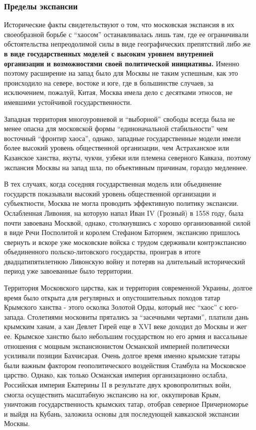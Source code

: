 \subsubsection{Пределы экспансии}

Исторические факты свидетельствуют о том, что московская экспансия в их
своеобразной борьбе с \enquote{хаосом} останавливалась лишь там, где ее ограничивали
обстоятельства непреодолимой силы в виде географических препятствий либо же \textbf{в
виде государственных моделей с высоким уровнем внутренней организации и
возможностями своей политической инициативы.} Именно поэтому расширение на запад
было для Москвы не таким успешным, как это происходило на севере, востоке и
юге, где в большинстве случаев, за исключением, пожалуй, Китая, Москва имела
дело с десятками этносов, не имевшими устойчивой государственности.

Западная территория многоуровневой и \enquote{выборной} свободы всегда была не менее
опасна для московской формы \enquote{единоначальной стабильности} чем восточный
\enquote{фронтир хаоса}, однако, западные государственные модели имели более высокий
уровень общественной организации, чем Астраханское или Казанское ханства,
якуты, чукчи, узбеки или племена северного Кавказа, поэтому экспансия Москвы на
запад шла, по объективным причинам, гораздо медленнее.

В тех случаях, когда соседняя государственная модель или объединение государств
показывали высокий уровень общественной организации и субъектности, Москва не
могла проводить эффективную политику экспансии. Ослабленная Ливония, на которую
напал Иван IV (Грозный) в 1558 году, была почти завоевана Москвой, однако,
столкнувшись с хорошо организованной силой в виде Речи Посполитой и королем
Стефаном Баторием, экспансию пришлось свернуть и вскоре уже московские войска с
трудом сдерживали контрэкспансию объединенного польско-литовского государства,
проиграв в итоге двадцатипятилетнюю Ливонскую войну и потеряв на длительный
исторический период уже завоеванные было территории.

Территория Московского царства, как и территория современной Украины, долгое
время было открыта для регулярных и опустошительных походов татар Крымского
ханства - этого осколка Золотой Орды, который нес \enquote{хаос} с юго-запада.
Столетиями московиты прятались за \enquote{засечными чертами}, платили дань крымским
ханам, а хан Девлет Гирей еще в XVI веке доходил до Москвы и жег ее. Крымское
ханство было небольшим государством но его армия и вассальные отношения с
мощным экспансионистом Османской империей политически усиливали позиции
Бахчисарая. Очень долгое время именно крымские татары были важным фактором
геополитического воздействия Стамбула на Московское царство. Однако, как только
Османская империя организационно ослабла, Российская империя Екатерины II в
результате двух кровопролитных войн, смогла осуществить масштабную экспансию на
юг, оккупировав Крым, уничтожив государственность крымских татар, отобрав
северное Причерноморье и выйдя на Кубань, заложила основы для последующей
кавказской экспансии Москвы.

